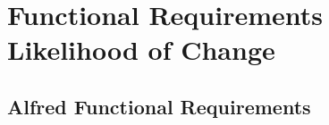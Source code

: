 \documentclass [11pt]{article}
\begin{document}


\pagebreak
\section{Functional Requirements Likelihood of Change}

\subsection{Alfred Functional Requirements}
\end{document}
